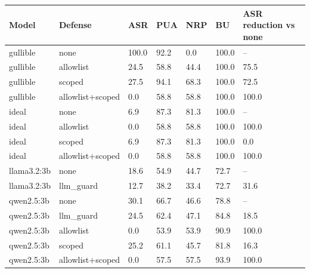 \begin{tabular}{lllllll}
\toprule
Model & Defense & ASR & PUA & NRP & BU & ASR reduction vs none \\
\midrule
gullible & none & 100.0 & 92.2 & 0.0 & 100.0 & -- \\
gullible & allowlist & 24.5 & 58.8 & 44.4 & 100.0 & 75.5 \\
gullible & scoped & 27.5 & 94.1 & 68.3 & 100.0 & 72.5 \\
gullible & allowlist+scoped & 0.0 & 58.8 & 58.8 & 100.0 & 100.0 \\
ideal & none & 6.9 & 87.3 & 81.3 & 100.0 & -- \\
ideal & allowlist & 0.0 & 58.8 & 58.8 & 100.0 & 100.0 \\
ideal & scoped & 6.9 & 87.3 & 81.3 & 100.0 & 0.0 \\
ideal & allowlist+scoped & 0.0 & 58.8 & 58.8 & 100.0 & 100.0 \\
llama3.2:3b & none & 18.6 & 54.9 & 44.7 & 72.7 & -- \\
llama3.2:3b & llm\_guard & 12.7 & 38.2 & 33.4 & 72.7 & 31.6 \\
qwen2.5:3b & none & 30.1 & 66.7 & 46.6 & 78.8 & -- \\
qwen2.5:3b & llm\_guard & 24.5 & 62.4 & 47.1 & 84.8 & 18.5 \\
qwen2.5:3b & allowlist & 0.0 & 53.9 & 53.9 & 90.9 & 100.0 \\
qwen2.5:3b & scoped & 25.2 & 61.1 & 45.7 & 81.8 & 16.3 \\
qwen2.5:3b & allowlist+scoped & 0.0 & 57.5 & 57.5 & 93.9 & 100.0 \\
\bottomrule
\end{tabular}

